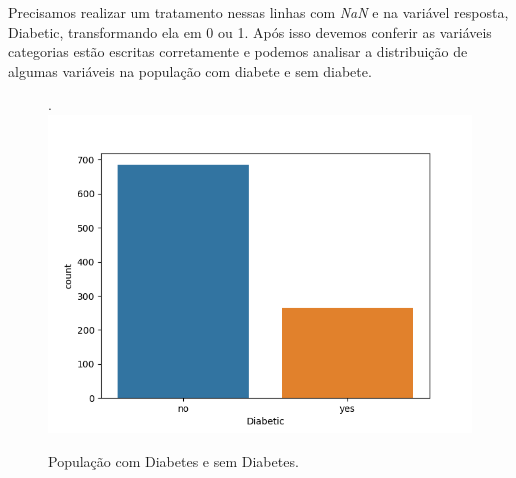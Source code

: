 Precisamos realizar um tratamento nessas linhas com \textit{NaN} e na variável resposta, Diabetic, transformando ela em 0 ou 1. Após isso devemos conferir as variáveis categorias estão escritas corretamente e podemos analisar a distribuição de algumas variáveis na população com diabete e sem diabete.


\begin{figure}[H]
 \caption{População com Diabetes e sem Diabetes.}.
 \label{fig:pop:targ:dia}
 \centering
 \includegraphics[scale=0.4]{images/diabete_tot.png}
\end{figure}


